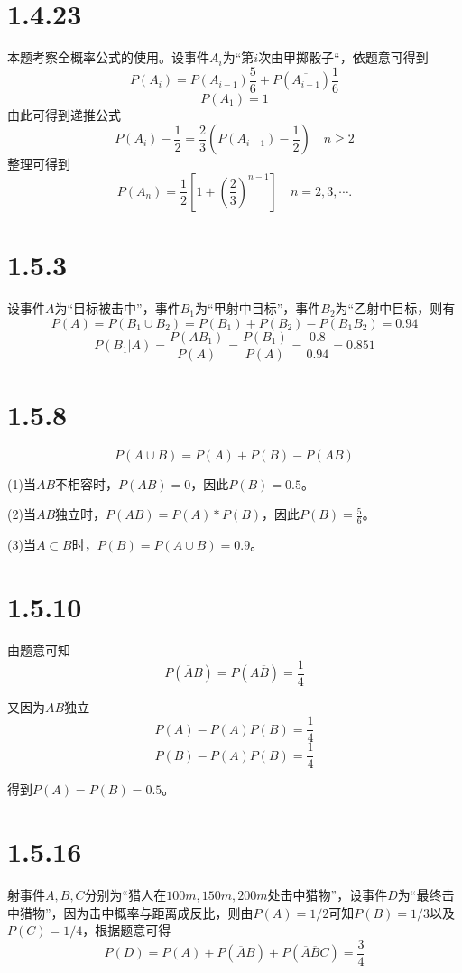 \documentclass{article}
\begin{document}
\section{1.4.23}
本题考察全概率公式的使用。设事件$A_{i}$为“第$i$次由甲掷骰子“，依题意可得到
$$P(A_{i})=P(A_{i-1})\frac{5}{6}+P(\overline{A_{i-1}})\frac{1}{6}$$
$$P(A_{1})=1$$
由此可得到递推公式
$$P(A_{i})-\frac{1}{2}=\frac{2}{3}(P(A_{i-1})-\frac{1}{2}) \quad n\ge2$$
整理可得到
$$P(A_{n})=\frac{1}{2}[1+(\frac{2}{3})^{n-1}] \quad n=2,3,\cdots.$$

\section{1.5.3}
设事件$A$为“目标被击中”，事件$B_{1}$为“甲射中目标”，事件$B_{2}$为“乙射中目标，则有
$$P(A)=P(B_{1}\cup B_{2})=P(B_{1})+P(B_{2})-P(B_{1}B_{2})=0.94$$
$$P(B_{1}|A)=\frac{P(AB_{1})}{P(A)}=\frac{P(B_{1})}{P(A)}=\frac{0.8}{0.94}=0.851$$

\section{1.5.8}
$$P(A\cup B)=P(A)+P(B)-P(AB)$$

(1)当$AB$不相容时，$P(AB)=0$，因此$P(B)=0.5$。

(2)当$AB$独立时，$P(AB)=P(A)*P(B)$，因此$P(B)=\frac{5}{6}$。

(3)当$A\subset B$时，$P(B)=P(A\cup B)=0.9$。

\section{1.5.10}
由题意可知
$$P(\overline A B)=P(A\overline B)=\frac{1}{4}$$

又因为$AB$独立
$$P(A)-P(A)P(B)=\frac{1}{4}$$
$$P(B)-P(A)P(B)=\frac{1}{4}$$

得到$P(A)=P(B)=0.5$。


\section{1.5.16}

射事件$A,B,C$分别为“猎人在$100m,150m,200m$处击中猎物”，设事件$D$为“最终击中猎物”，因为击中概率与距离成反比，则由$P(A)=1/2$可知$P(B)=1/3$以及$P(C)=1/4$，根据题意可得
$$P(D)=P(A)+P(\overline A B)+P(\overline A \overline B C)=\frac{3}{4}$$
\end{document}
